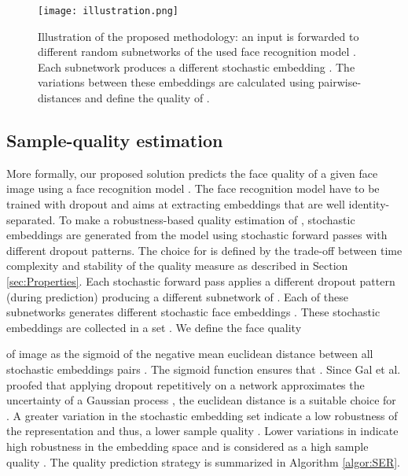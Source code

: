 \documentclass[10pt,twocolumn,letterpaper]{article}
\begin{document}
\begin{figure}[h]
\centering
\texttt{[image: illustration.png]}
\caption{Illustration of the proposed methodology: an input  is forwarded to different random subnetworks of the used face recognition model . Each subnetwork produces a different stochastic embedding . The variations between these embeddings are calculated using pairwise-distances and define the quality of . }
\label{fig:Illustration}
\end{figure}











\subsection{Sample-quality estimation}

More formally, our proposed solution predicts the face quality  of a given face image  using a face recognition model .
The face recognition model have to be trained with dropout and aims at extracting embeddings that are well identity-separated.
To make a robustness-based quality estimation of ,  stochastic embeddings are generated from the model  using stochastic forward passes with different dropout patterns.
The choice for  is defined by the trade-off between time complexity and stability of the quality measure as described in Section \ref{sec:Properties}.
Each stochastic forward pass applies a different dropout pattern (during prediction) producing a different subnetwork of . 
Each of these subnetworks generates different stochastic face embeddings .
These stochastic embeddings are collected in a set .
We define the face quality

of image  as the sigmoid of the negative mean euclidean distance  between all stochastic embeddings pairs .
The sigmoid function  ensures that  . 
Since Gal et al. \cite{Gal2015DropoutAA} proofed that applying dropout repetitively on a network approximates the uncertainty of a Gaussian process \cite{Rasmussen06gaussianprocesses}, the euclidean distance is a suitable choice for . A greater variation in the stochastic embedding set  indicate a low robustness of the representation and thus, a lower sample quality .
Lower variations in  indicate high robustness in the embedding space and is considered as a high sample quality .
The quality prediction strategy is summarized in Algorithm \ref{algor:SER}. 
\end{document}
